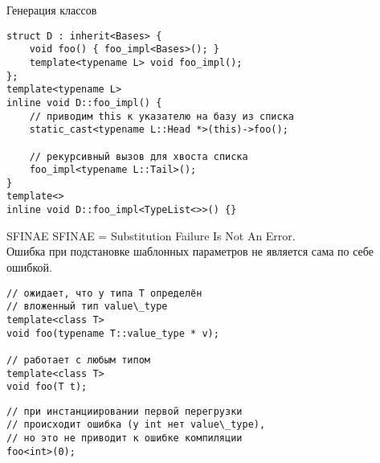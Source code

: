 \documentclass{beamer}
\begin{document}
\begin{frame}[fragile]{Генерация классов}
\begin{lstlisting}
struct D : inherit<Bases> {
    void foo() { foo_impl<Bases>(); } 
    template<typename L> void foo_impl();
};
template<typename L> 
inline void D::foo_impl() {
    // приводим this к указателю на базу из списка
    static_cast<typename L::Head *>(this)->foo();
    
    // рекурсивный вызов для хвоста списка
    foo_impl<typename L::Tail>();
}
template<> 
inline void D::foo_impl<TypeList<>>() {}
\end{lstlisting}
\end{frame}


% 
% 

\begin{frame}[fragile]{SFINAE}
 SFINAE = Substitution Failure Is Not An Error.\\
 Ошибка при подстановке шаблонных параметров не является сама по себе ошибкой.
\begin{lstlisting}
// ожидает, что у типа T определён 
// вложенный тип value\_type
template<class T>
void foo(typename T::value_type * v);

// работает с любым типом
template<class T>
void foo(T t);
\end{lstlisting}
\begin{lstlisting}
// при инстанциировании первой перегрузки
// происходит ошибка (у int нет value\_type), 
// но это не приводит к ошибке компиляции
foo<int>(0);
\end{lstlisting}
\end{frame}
\end{document}
